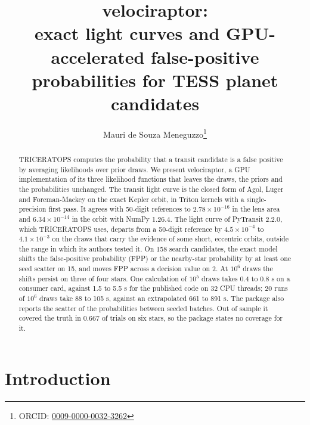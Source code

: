 \documentclass[11pt]{article}
\title{velociraptor:\\ exact light curves and GPU-accelerated false-positive probabilities for TESS planet candidates}
\author{Mauri de Souza Meneguzzo\thanks{ORCID: \href{https://orcid.org/0009-0000-0032-3262}{0009-0000-0032-3262}}}
\date{}
\begin{document}
\maketitle

\begin{abstract}
TRICERATOPS computes the probability that a transit candidate is a false positive by averaging likelihoods over prior draws. We present velociraptor, a GPU implementation of its three likelihood functions that leaves the draws, the priors and the probabilities unchanged. The transit light curve is the closed form of Agol, Luger and Foreman-Mackey on the exact Kepler orbit, in Triton kernels with a single-precision first pass. It agrees with 50-digit references to $2.78\times10^{-16}$ in the lens area and $6.34\times10^{-14}$ in the orbit with NumPy 1.26.4. The light curve of PyTransit 2.2.0, which TRICERATOPS uses, departs from a 50-digit reference by $4.5\times10^{-4}$ to $4.1\times10^{-3}$ on the draws that carry the evidence of some short, eccentric orbits, outside the range in which its authors tested it. On 158 search candidates, the exact model shifts the false-positive probability (FPP) or the nearby-star probability by at least one seed scatter on 15, and moves FPP across a decision value on 2. At $10^{6}$ draws the shifts persist on three of four stars. One calculation of $10^{5}$ draws takes 0.4 to 0.8 s on a consumer card, against 1.5 to 5.5 s for the published code on 32 CPU threads; 20 runs of $10^{6}$ draws take 88 to 105 s, against an extrapolated 661 to 891 s. The package also reports the scatter of the probabilities between seeded batches. Out of sample it covered the truth in 0.667 of trials on six stars, so the package states no coverage for it.
\end{abstract}

\section{Introduction}
\end{document}
